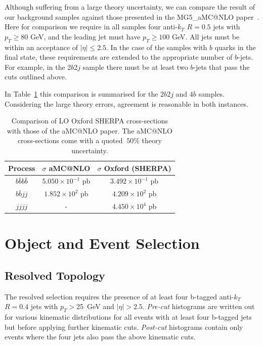 \documentclass[12pt]{article}
\begin{document}
Although suffering from a large theory uncertainty, we can compare the result of our background samples against those presented in the MG5\_aMC@NLO paper~\cite{Alwall:2014hca}.
Here for comparison we require in all samples four anti-$k_T$ $R=0.5$ jets with $p_T \ge 80 $ GeV, and the leading jet must have $p_T \ge 100$ GeV. All jets must be within an acceptance of $|\eta| \le 2.5 $. In the case of the samples with $b$ quarks in the final state, these requirements are extended to the appropriate number of $b$-jets. For example, in the 2$b$2$j$ sample there must be at least two $b$-jets that pass the cuts outlined above.

In Table~\ref{tab:xsecs} this comparison is summarised for the $2b2j$ and $4b$ samples. Considering the large theory errors, agreement is reasonable in both instances.

\begin{table}[h]
\begin{center}
\begin{tabular}{|c|c|c|}
\hline
Process & $\sigma$ aMC@NLO & $\sigma$ Oxford (SHERPA) \\
\hline\hline
$b\bar{b}b\bar{b}$ & $5.050 \times  10^{-1}$ pb & $3.492\times10^{-1}$ pb \\ 
$b\bar{b}jj$ & $1.852 \times 10^2$ pb &$4.209 \times 10^2$ pb \\ 
$jjjj$ & -  & $4.450\times 10^4$ pb \\
\hline
\end{tabular}
\caption{Comparison of LO Oxford SHERPA cross-sections with those of the aMC@NLO paper. The aMC@NLO cross-sections come with a quoted $~50\%$ theory uncertainty.} \label{tab:xsecs}
\end{center}
\end{table}%
\section{Object and Event Selection}

\subsection{Resolved Topology}

The resolved selection requires the presence of at least four b-tagged anti-$k_T$ $R=0.4$ jets with $p_T >$25~GeV and $|\eta|>2.5$.
\textit{Pre-cut} histograms are written out for various kinematic distributions for all events with at least four b-tagged jets but before applying
further kinematic cuts. \textit{Post-cut} histograms contain only events where the four jets also pass the above kinematic cuts.
\end{document}
